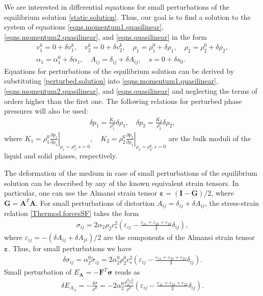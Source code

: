 \documentclass[3p,times,table]{article}
\renewcommand{\AA}{{\bm{A}}}
\newcommand{\GG}{{\boldsymbol{G}}}
\newcommand{\FF}{{\bm{F}}}
\begin{document}
We are interested in differential equations for small 
perturbations of the equilibrium solution \eqref{static.solution}. Thus, our 
goal is to find a solution  to the system of equations \eqref{eqns.momentum1.quasilinear}, 
\eqref{eqns.momentum2.quasilinear}, and 
\eqref{eqns.quasilinear} in the form
\begin{subequations}\label{perturbed.solution} 
	\begin{gather} 
		v_1^k=0 +\delta v_1^k, \quad v_2^k=0 +\delta v_2^k, \quad
		\rho_1=\rho_1^0 +\delta \rho_1, \quad \rho_2=\rho_2^0+\delta \rho_2, 
		\\[2mm] 
		\alpha_1=\alpha_1^0+\delta \alpha_1, \quad A_{ij}=\delta_{ij}+\delta 
		A_{ij}, \quad s=0+\delta s_0.
	\end{gather}
\end{subequations}
Equations for perturbations of the equilibrium solution can be derived by 
substituting \eqref{perturbed.solution} into 
\eqref{eqns.momentum1.quasilinear}, 
\eqref{eqns.momentum2.quasilinear}, and 
\eqref{eqns.quasilinear} and neglecting the terms of orders higher than the 
first one. 
The following relations for perturbed phase pressures will also be used:
\begin{align}\label{pressure.linear}
\delta p_1 =\frac{K_1}{\rho_1^0} \delta \rho_1, \quad \delta p_2 = \frac{K_2}{\rho_2^0} \delta \rho_2,
\end{align}
where $
K_1=\left. \rho_1^0\frac{\partial p_1}{\partial \rho_1}\right|_{\rho_1=\rho_1^0, s=0},
\quad
K_2=\left. \rho_2^0\frac{\partial p_2}{\partial \rho_2}\right|_{\rho_2=\rho_2^0, s=0} 
$ 
are the bulk moduli of the liquid and solid phases, respectively.

The deformation of the medium in case of small perturbations of the equilibrium 
solution can be described by any of the known equivalent strain tensors. In 
particular, one can use 
the Almansi strain tensor $\bm{\varepsilon} = (\bm{I} - \GG)/2$, where 
$\GG=\AA^T \AA$. 
For small perturbations of distortion $A_{ij}=\delta_{ij}+\delta 
A_{ij}$, 
the stress-strain relation \eqref{Thermod.forcesSF} takes the form 
\begin{align} \label{stress}
\sigma_{ij}=2\alpha_2 \rho_2 c^2_s \left(\varepsilon_{ij}-\frac{\varepsilon_{11}+\varepsilon_{22}+\varepsilon_{22}}{3}\delta_{ij}\right),
\end{align}  
where $\varepsilon_{ij}=-(\delta A_{ij}+\delta A_{ji})/2$ are the components of the 
Almansi strain tensor $ \bm{\varepsilon} $. Thus, for small
perturbations we have
\begin{align} \label{stress1}
\delta \sigma_{ij}= \alpha_2^0 \tilde \sigma_{ij} =
2\alpha_2^0 \rho_2^0 c^2_s \left(\varepsilon_{ij}-\frac{\varepsilon_{11}+\varepsilon_{22}+\varepsilon_{22}}{3}\delta_{ij}\right).
\end{align}  
Small perturbation of $E_{\AA}=-\FF^T \bm{\sigma}$ reads as
\begin{align}
\delta E_{A_{ij}}=- \frac{\delta \sigma}{\rho^0}=-
2\alpha_2^0 \frac{\rho_2^0 c^2_s}{\rho^0} \left(\varepsilon_{ij}-\frac{\varepsilon_{11}+\varepsilon_{22}+\varepsilon_{22}}{3}\delta_{ij}\right).
\end{align} 
\end{document}
